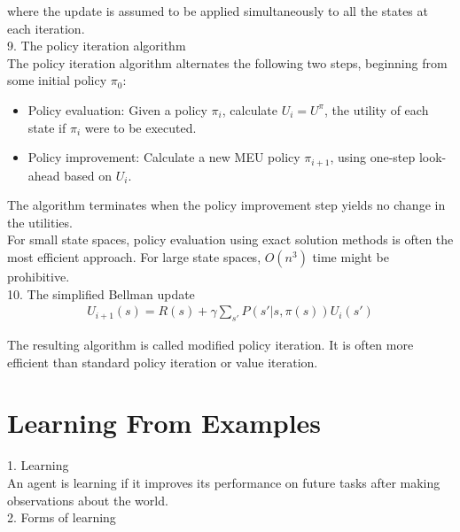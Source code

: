 \documentclass[12pt]{article}
\begin{document}
where the update is assumed to be applied simultaneously to all the states at each iteration. \\

9. The policy iteration algorithm \\

The policy iteration algorithm alternates the following two steps, beginning from some initial policy $\pi_0$:
\begin{itemize}
\item Policy evaluation: Given a policy $\pi_i$, calculate $U_i = U^{\pi}$, the utility of each state if $\pi_i$ were to be executed.
\item Policy improvement: Calculate a new MEU policy $\pi_{i+1}$, using one-step look-ahead based on $U_i$.
\end{itemize}

The algorithm terminates when the policy improvement step yields no change in the utilities. \\

For small state spaces, policy evaluation using exact solution methods is often the most efficient approach. For large state spaces, $O(n^3)$ time might be prohibitive. \\

10. The simplified Bellman update
\begin{eqnarray*}
U_{i+1}(s) = R(s) + \gamma \sum_{s'} P(s' | s, \pi(s)) U_i(s')
\end{eqnarray*}

The resulting algorithm is called modified policy iteration. It is often more efficient than standard policy iteration or value iteration.

\section*{Learning From Examples}

1. Learning \\

An agent is learning if it improves its performance on future tasks after making observations about the world. \\

2. Forms of learning \\
\end{document}
